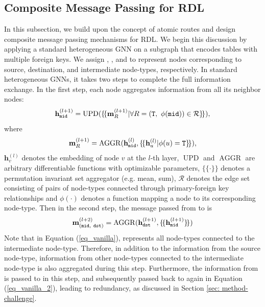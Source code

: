 \documentclass{article}
\theoremstyle{plain}
\theoremstyle{definition}
\theoremstyle{remark}
\begin{document}
\subsection{Composite Message Passing for RDL}
\label{sec: method-composite}
In this subsection, we build upon the concept of atomic routes and design composite message passing mechanisms for RDL. We begin this discussion by applying a standard heterogeneous GNN on a subgraph that encodes tables with multiple foreign keys. We assign \src, \dst, and \midd to represent nodes corresponding to source, destination, and intermediate node-types, respectively. 
In standard heterogeneous GNNs, it takes two steps to complete the full information exchange. In the first step, each \midd node aggregates information from all its neighbor nodes:
\begin{equation}
\label{eq_vanilla}
      \mathbf{h}_{\texttt{mid}}^{(l+1)}=\operatorname{UPD}(\{\!\{ \mathbf{m}_{R}^{(l+1)}|\forall R=(\texttt{T},\  \phi(\texttt{mid}))\in\mathcal{R} \}\!\}),
\end{equation}
where
\begin{equation*}
    \mathbf{m}_{R}^{(l+1)}=\operatorname{AGGR}(\mathbf{h}_{\texttt{mid}}^{(l)},\{\!\{ \mathbf{h}_{u}^{(l)}| \phi(u)=\texttt{T} \}\!\}),
\end{equation*}
$\mathbf{h}_v^{(l)}$ denotes the embedding of node $v$ at the $l$-th layer, $\operatorname{UPD}$ and $\operatorname{AGGR}$ are arbitrary differentiable functions with optimizable parameters, $\{\!\{\cdot\}\!\}$ denotes a permutation invariant set aggregator (e.g. mean, sum), $\mathcal{R}$ denotes the edge set consisting of pairs of node-types connected through primary-foreign key relationships and $\phi(\cdot)$ denotes a function mapping a node to its corresponding node-type.
Then in the second step, the message passed from \midd to \dst is 
\begin{equation}
\label{eq_vanilla_2}
    \mathbf{m}_{(\midd,\ \dst)}^{(l+2)}=\operatorname{AGGR}(\mathbf{h}_{\dst}^{(l+1)},\{\!\{ \mathbf{h}_{\midd}^{(l+1)} \}\!\})
\end{equation}
Note that in Equation (\ref{eq_vanilla}), \tea represents all node-types connected to the intermediate node-type. Therefore, in addition to the information from the source node-type, information from other node-types connected to the intermediate node-type is also aggregated during this step. Furthermore, the information from \dst is passed to \midd in this step, and subsequently passed back to \dst again in Equation (\ref{eq_vanilla_2}), leading to redundancy, as discussed in Section \ref{sec: method-challenge}.
\end{document}
